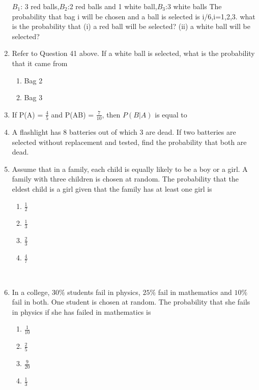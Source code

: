 \begin{enumerate}
$B_1$: 3 red balls,$B_2$:2 red balls and 1 white ball,$B_3$:3 white balls
The probability that bag i will be chosen and a ball is selected is i/6,i=1,2,3.
what is the probability that
(i) a red ball will be selected?     
(ii) a white ball will be selected?\\
\solution

\item Refer to Question 41 above. If a white ball is selected, what is the probability that it came from\\
\begin{enumerate}
\item  Bag 2
\item  Bag 3
\end{enumerate}
\solution

\item If P(A) = $\frac{4}{5}$ and P(AB) = $\frac{7}{10}$, then $P(B|A)$ is equal to\\
\solution

\item A flashlight has 8 batteries out of which 3 are dead. If two batteries are selected without replacement and tested, find the probability that both are dead.\\

\item Assume that in a family, each child is equally likely to be a boy or a girl. A family with three children is chosen at random. The probability that the eldest child is a girl given that the family has at least one girl is
\begin{enumerate}
\item $\frac{1}{2}$
\item $\frac{1}{3}$
\item $\frac{2}{3}$
\item $\frac{4}{7}$
\end{enumerate}
\\

\item In a college, $30\%$ students fail in physics, $25\%$ fail in mathematics and $10\%$ fail in both. One student is chosen at random. The probability that she fails in physics if she has failed in mathematics is
\begin{enumerate}
    \item $\frac{1}{10}$
    \item $\frac{2}{5}$
    \item $\frac{9}{20}$
    \item $\frac{1}{3}$
\end{enumerate}
\\

\end{enumerate}
